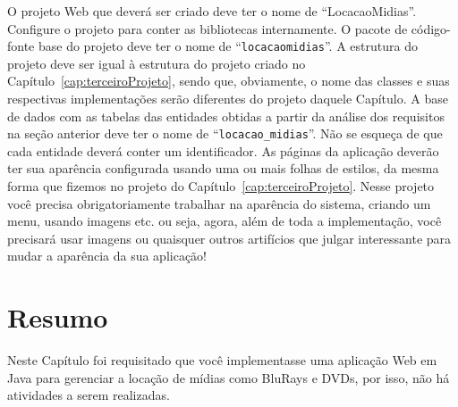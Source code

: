 O projeto Web que deverá ser criado deve ter o nome de ``LocacaoMidias''. Configure o projeto para conter as bibliotecas internamente. O pacote de código-fonte base do projeto deve ter o nome de ``\texttt{locacaomidias}''. A estrutura do projeto deve ser igual à estrutura do projeto criado no Capítulo~\ref{cap:terceiroProjeto}, sendo que, obviamente, o nome das classes e suas respectivas implementações serão diferentes do projeto daquele Capítulo. A base de dados com as tabelas das entidades obtidas a partir da análise dos requisitos na seção anterior deve ter o nome de ``\texttt{locacao\_midias}''. Não se esqueça de que cada entidade deverá conter um identificador. As páginas da aplicação deverão ter sua aparência configurada usando uma ou mais folhas de estilos, da mesma forma que fizemos no projeto do Capítulo~\ref{cap:terceiroProjeto}. Nesse projeto você precisa obrigatoriamente trabalhar na aparência do sistema, criando um menu, usando imagens etc. ou seja, agora, além de toda a implementação, você precisará usar imagens ou quaisquer outros artifícios que julgar interessante para mudar a aparência da sua aplicação!


\section{Resumo}

Neste Capítulo foi requisitado que você implementasse uma aplicação Web em Java para gerenciar a locação de mídias como BluRays e DVDs, por isso, não há atividades a serem realizadas.
